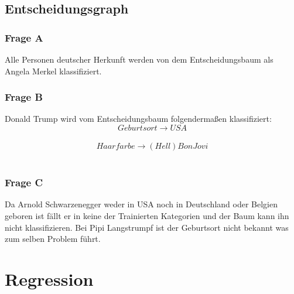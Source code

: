 \documentclass[a4paper]{article}
\begin{document}
\subsection{Entscheidungsgraph}
\subsubsection{Frage A}
Alle Personen deutscher Herkunft werden von dem Entscheidungsbaum als Angela Merkel klassifiziert.
\subsubsection{Frage B}
Donald Trump wird vom Entscheidungsbaum folgendermaßen klassifiziert:\\
$$Geburtsort \rightarrow USA$$\\
$$Haarfarbe \rightarrow (Hell) Bon Jovi$$\\
\subsubsection{Frage C}
Da Arnold Schwarzenegger weder in USA noch in Deutschland oder Belgien geboren ist fällt er in keine der Trainierten Kategorien und der Baum kann ihn nicht klassifizieren. Bei Pipi Langstrumpf ist der Geburtsort nicht bekannt was zum selben Problem führt.


\section{Regression}
\end{document}
